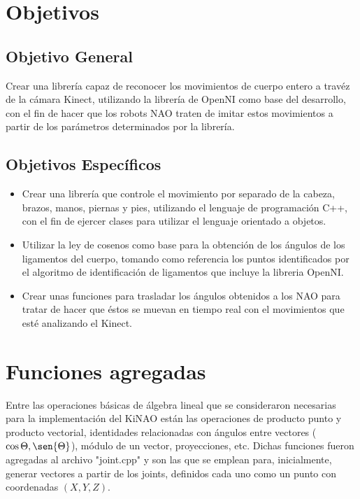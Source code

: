 \documentclass[letterpaper]{article}
\begin{document}
\section{Objetivos}
\subsection{Objetivo General}

Crear una librería capaz de reconocer los movimientos de cuerpo entero a travéz de la cámara Kinect, utilizando la librería de OpenNI como base del desarrollo, con el fin de hacer que los robots NAO traten de imitar estos movimientos a partir de los parámetros determinados por la librería.

\subsection{Objetivos Específicos}

\begin{itemize}
\item Crear una librería que controle el movimiento por separado de la cabeza, brazos, manos, piernas y pies, utilizando el lenguaje de programación C++, con el fin de ejercer clases para utilizar el lenguaje orientado a objetos.
\item Utilizar la ley de cosenos como base para la obtención de los ángulos de los ligamentos del cuerpo, tomando como referencia los puntos identificados por el algoritmo de identificación de ligamentos que incluye la libreria OpenNI.
\item Crear unas funciones para trasladar los ángulos obtenidos a los NAO para tratar de hacer que éstos se muevan en tiempo real con el movimientos que esté analizando el Kinect.
\end{itemize}

\section{Funciones agregadas}

Entre las operaciones básicas de álgebra lineal que se consideraron necesarias para la implementación del KiNAO están las operaciones de producto punto y producto vectorial, identidades relacionadas con ángulos entre vectores ($\cos{\Theta}, \sen{\Theta}$), módulo de un vector, proyecciones, etc. Dichas funciones fueron agregadas al archivo "joint.cpp" y son las que se emplean para, inicialmente, generar vectores a partir de los joints, definidos cada uno como un punto con coordenadas $(X,Y,Z)$.\\ 
\end{document}
